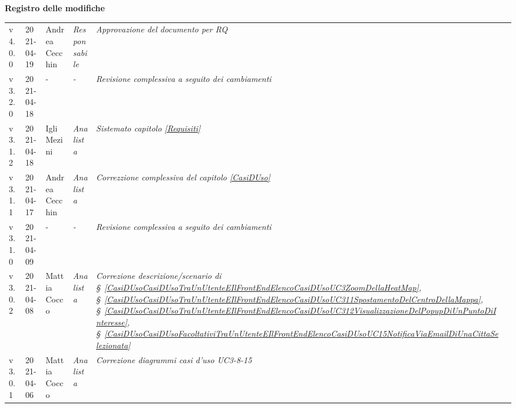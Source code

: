 \quad
\begin{center}
	\LARGE\textbf{Registro delle modifiche}
\end{center}
\def\tabularxcolumn#1{m{#1}}
{

\begin{center}
	\renewcommand{\arraystretch}{1.4}
	\begin{longtable}[c]{|p{2cm-1\tabcolsep}|p{2cm}|p{3cm-2\tabcolsep}|p{}|p{}|p{3cm}|}
		\hline
		\rowcolor{airforceblue}
		\makecell[c]{\textbf{Versione}} & \makecell[c]{\textbf{Data}} & \makecell[c]{\textbf{Autore}} & \makecell[c]{\textbf{Ruolo}} & \makecell[c]{\textbf{Modifica}} & \makecell[c]{\textbf{Verificatore}} \\
		\hline
		\centering v4.0.0 & 2021-04-19 & Andrea Cecchin & \centering \textit{Responsabile} & \textit{Approvazione del documento per RQ} & \makecell[c]{-}\\
		\hline
		\centering v3.2.0 & 2021-04-18 & \centering - & \centering \textit{-} & \textit{Revisione complessiva a seguito dei cambiamenti} & \makecell[c]{Emma Roveroni}\\
		\hline
		\centering v3.1.2 & 2021-04-18 & Igli Mezini & \centering \textit{Analista} & \textit{Sistemato capitolo \ref{Requisiti}} & \makecell[c]{Alfredo Graziano}\\
		\hline
		\centering v3.1.1 & 2021-04-17 & Andrea Cecchin & \centering \textit{Analista} & \textit{Correzzione complessiva del capitolo \ref{CasiDUso}} & \makecell[c]{Alfredo Graziano}\\
		\hline
		\centering v3.1.0 & 2021-04-09 & \centering - & \centering \textit{-} & \textit{Revisione complessiva a seguito dei cambiamenti} & \makecell[c]{Andrea Cecchin}\\
		\hline
		\centering v3.0.2 & 2021-04-08 & Mattia Cocco & \centering \textit{Analista} & \textit{Correzione descrizione/scenario di \S~\ref{CasiDUsoCasiDUsoTraUnUtenteEIlFrontEndElencoCasiDUsoUC3ZoomDellaHeatMap}, \S~\ref{CasiDUsoCasiDUsoTraUnUtenteEIlFrontEndElencoCasiDUsoUC311SpostamentoDelCentroDellaMappa}, \S~\ref{CasiDUsoCasiDUsoTraUnUtenteEIlFrontEndElencoCasiDUsoUC312VisualizzazioneDelPopupDiUnPuntoDiInteresse}, \S~\ref{CasiDUsoCasiDUsoFacoltativiTraUnUtenteEIlFrontEndElencoCasiDUsoUC15NotificaViaEmailDiUnaCittaSelezionata}} &  \makecell[c]{Andrea Cecchin} \\
		\hline
		\centering v3.0.1 & 2021-04-06 & Mattia Cocco & \centering \textit{Analista} & \textit{Correzione diagrammi casi d'uso UC3-8-15} & \makecell[c]{Andrea Cecchin}\\

\end{longtable}
\end{center}}
